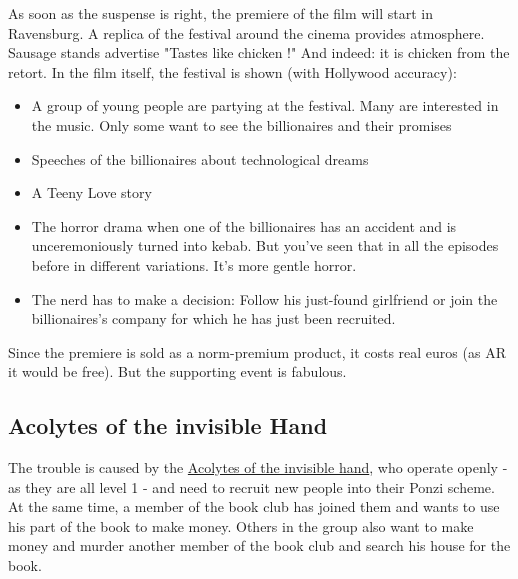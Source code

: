 As soon as the suspense is right, the premiere of the film will start in Ravensburg. A replica of the festival around the cinema provides atmosphere. Sausage stands advertise "Tastes like chicken !" And indeed: it is chicken from the retort.
In the film itself, the festival is shown (with Hollywood accuracy):
\begin{itemize}
    \item A group of young people are partying at the festival. Many are interested in the music. Only some want to see the billionaires and their promises
    \item Speeches of the billionaires about technological dreams
    \item A Teeny Love story
    \item The horror drama when one of the billionaires has an accident and is unceremoniously turned into kebab. But you've seen that in all the episodes before in different variations. It's more gentle horror.
    \item The nerd has to make a decision: Follow his just-found girlfriend or join the billionaires's company for which he has just been recruited.
\end{itemize}
Since the premiere is sold as a norm-premium product, it costs real euros (as AR it would be free). But the supporting event is fabulous.

\subsection{Acolytes of the invisible Hand}

The trouble is caused by the \hyperref[sec:acolytes of the invisible hand]{Acolytes of the invisible hand}, who operate openly - as they are all level 1 - and need to recruit new people into their Ponzi scheme. At the same time, a member of the book club has joined them and wants to use his part of the book to make money. Others in the group also want to make money and murder another member of the book club and search his house for the book.
